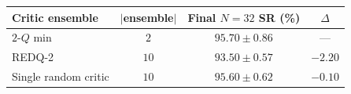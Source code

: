 \begin{tabular}{lccc}
\hline
Critic ensemble & $|$ensemble$|$ & Final $N{=}32$ SR (\%) & $\Delta$ \\
\hline
$2$-$Q$ min & $2$ & $95.70 \pm 0.86$ & --- \\
REDQ-2 & $10$ & $93.50 \pm 0.57$ & $-2.20$ \\
Single random critic & $10$ & $95.60 \pm 0.62$ & $-0.10$ \\
\hline
\end{tabular}
